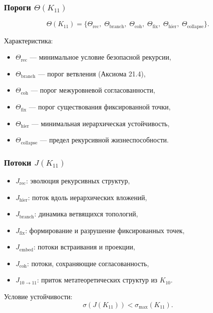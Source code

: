 \subsubsection{Пороги $\Theta(K_{11})$}

\[
\Theta(K_{11})=
\{
\Theta_{\mathrm{rec}},\;
\Theta_{\mathrm{branch}},\;
\Theta_{\mathrm{coh}},\;
\Theta_{\mathrm{fix}},\;
\Theta_{\mathrm{hier}},\;
\Theta_{\mathrm{collapse}}
\}.
\]

Характеристика:
\begin{itemize}
    \item $\Theta_{\mathrm{rec}}$ — минимальное условие безопасной рекурсии,
    \item $\Theta_{\mathrm{branch}}$ — порог ветвления (Аксиома 21.4),
    \item $\Theta_{\mathrm{coh}}$ — порог межуровневой согласованности,
    \item $\Theta_{\mathrm{fix}}$ — порог существования фиксированной точки,
    \item $\Theta_{\mathrm{hier}}$ — минимальная иерархическая устойчивость,
    \item $\Theta_{\mathrm{collapse}}$ — предел рекурсивной жизнеспособности.
\end{itemize}

\subsubsection{Потоки $J(K_{11})$}

\begin{itemize}
    \item $J_{\mathrm{rec}}$: эволюция рекурсивных структур,
    \item $J_{\mathrm{hier}}$: поток вдоль иерархических вложений,
    \item $J_{\mathrm{branch}}$: динамика ветвящихся топологий,
    \item $J_{\mathrm{fix}}$: формирование и разрушение фиксированных точек,
    \item $J_{\mathrm{embed}}$: потоки встраивания и проекции,
    \item $J_{\mathrm{coh}}$: потоки, сохраняющие согласованность,
    \item $J_{10\to11}$: приток метатеоретических структур из $K_{10}$.
\end{itemize}

Условие устойчивости:
\[
\sigma(J(K_{11})) < \sigma_{\max}(K_{11}).
\]

